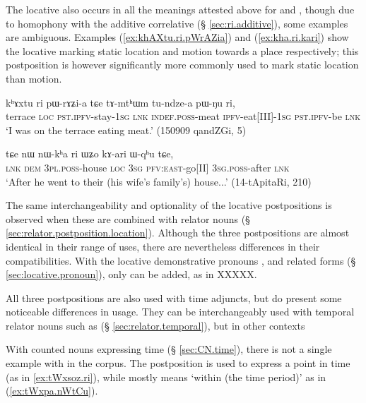  The locative  also occurs in all the meanings attested above for  and , though due to homophony with the additive correlative  (§ \ref{sec:ri.additive}), some examples are ambiguous. Examples (\ref{ex:khAXtu.ri.pWrAZia}) and (\ref{ex:kha.ri.kari}) show the locative  marking static location and motion towards a place respectively;  this postposition is however significantly more commonly used to mark static location than motion.

\begin{exe}
\ex \label{ex:khAXtu.ri.pWrAZia}
\gll   kʰɤxtu ri pɯ-rɤʑi-a tɕe tɤ-mtʰɯm tu-ndze-a pɯ-ŋu ri, \\
terrace \textsc{loc} \textsc{pst}.\textsc{ipfv}-stay-\textsc{1sg} \textsc{lnk} \textsc{indef}.\textsc{poss}-meat \textsc{ipfv}-eat[III]-\textsc{1sg} \textsc{pst}.\textsc{ipfv}-be \textsc{lnk} \\
\glt `I was on the terrace eating meat.' (150909 qandZGi, 5)
 \end{exe}
 
 \begin{exe}
\ex \label{ex:kha.ri.kari}
\gll   tɕe nɯ nɯ-kʰa ri ɯʑo kɤ-ari ɯ-qʰu tɕe, \\
\textsc{lnk} \textsc{dem} \textsc{3pl}.\textsc{poss}-house \textsc{loc} \textsc{3sg} \textsc{pfv}:\textsc{east}-go[II] \textsc{3sg}.\textsc{poss}-after \textsc{lnk} \\
\glt `After he went to their (his wife's family's) house...' (14-tApitaRi, 210)
  \end{exe}
  
The same interchangeability and optionality of the locative postpositions is observed when these are combined with relator nouns (§ \ref{sec:relator.postposition.location}). Although the three postpositions are almost identical in their range of uses, there are nevertheless differences in their compatibilities. With the locative demonstrative pronouns ,  and related forms (§ \ref{sec:locative.pronoun}), only  can be added, as in XXXXX.

All three postpositions are also used with time adjuncts, but do present some noticeable differences in usage. They can be interchangeably used with temporal relator nouns such as  (§ \ref{sec:relator.temporal}), but in other contexts 

With counted nouns expressing time (§ \ref{sec:CN.time}), there is not a single example with  in the corpus. The postposition  is used to express a point in time  (as in \ref{ex:tWxsoz.ri}), while  mostly means `within (the time period)' as in (\ref{ex:tWxpa.nWtCu}).  

